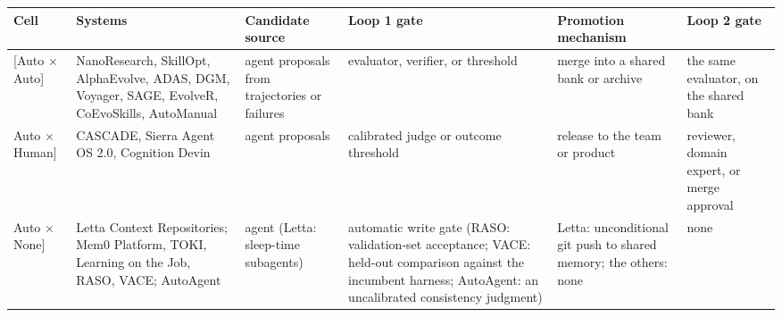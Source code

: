 \documentclass[
  11pt,
]{article}
\newcounter{none} %
\begin{document}
{\def\LTcaptype{none} %
\begin{longtable}[]{@{}
  >{\raggedright\arraybackslash}p{}
  >{\raggedright\arraybackslash}p{}
  >{\raggedright\arraybackslash}p{}
  >{\raggedright\arraybackslash}p{}
  >{\raggedright\arraybackslash}p{}
  >{\raggedright\arraybackslash}p{}@{}}
\toprule\noalign{}
\begin{minipage}[b]{\linewidth}\raggedright
Cell
\end{minipage} & \begin{minipage}[b]{\linewidth}\raggedright
Systems
\end{minipage} & \begin{minipage}[b]{\linewidth}\raggedright
Candidate source
\end{minipage} & \begin{minipage}[b]{\linewidth}\raggedright
Loop 1 gate
\end{minipage} & \begin{minipage}[b]{\linewidth}\raggedright
Promotion mechanism
\end{minipage} & \begin{minipage}[b]{\linewidth}\raggedright
Loop 2 gate
\end{minipage} \\
\midrule\noalign{}
\endhead
\bottomrule\noalign{}
\endlastfoot
{[}Auto × Auto{]} & NanoResearch, SkillOpt, AlphaEvolve, ADAS, DGM, Voyager, SAGE, EvolveR, CoEvoSkills, AutoManual & agent proposals from trajectories or failures & evaluator, verifier, or threshold & merge into a shared bank or archive & the same evaluator, on the shared bank \\
{[}Auto × Human{]} & CASCADE, Sierra Agent OS 2.0, Cognition Devin & agent proposals & calibrated judge or outcome threshold & release to the team or product & reviewer, domain expert, or merge approval \\
{[}Auto × None{]} & Letta Context Repositories; Mem0 Platform, TOKI, Learning on the Job, RASO, VACE; AutoAgent & agent (Letta: sleep-time subagents) & automatic write gate (RASO: validation-set acceptance; VACE: held-out comparison against the incumbent harness; AutoAgent: an uncalibrated consistency judgment) & Letta: unconditional git push to shared memory; the others: none & none \\

\end{longtable}}
\end{document}
